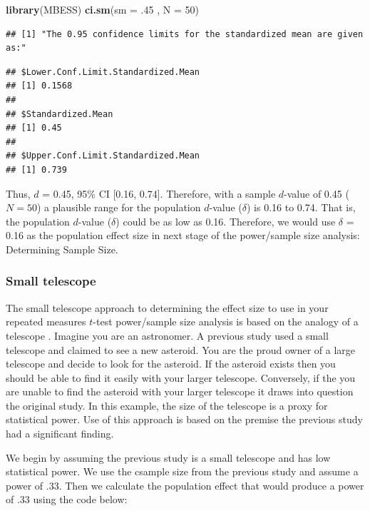 \documentclass[
]{krantz}
\makeatletter
\newenvironment{Shaded}{\begin{snugshade}}{\end{snugshade}}
\newcommand{\DataTypeTok}[1]{\textcolor[rgb]{0.27,0.27,0.27}{#1}}
\newcommand{\DecValTok}[1]{\textcolor[rgb]{0.06,0.06,0.06}{#1}}
\newcommand{\FloatTok}[1]{\textcolor[rgb]{0.06,0.06,0.06}{#1}}
\newcommand{\KeywordTok}[1]{\textcolor[rgb]{0.27,0.27,0.27}{\textbf{#1}}}
\newcommand{\NormalTok}[1]{#1}
\newenvironment{kframe}{%
\medskip{}
\setlength{\fboxsep}{.8em}
 \def\at@end@of@kframe{}%
 \ifinner\ifhmode%
  \def\at@end@of@kframe{\end{minipage}}%
  \begin{minipage}{\columnwidth}%
 \fi\fi%
 \def\FrameCommand##1{\hskip\@totalleftmargin \hskip-\fboxsep
 \colorbox{shadecolor}{##1}\hskip-\fboxsep
     \hskip-\linewidth \hskip-\@totalleftmargin \hskip\columnwidth}%
 \MakeFramed {\advance\hsize-\width
   \@totalleftmargin\z@ \linewidth\hsize
   \@setminipage}}%
 {\par\unskip\endMakeFramed%
 \at@end@of@kframe}
\renewenvironment{Shaded}{\begin{kframe}}{\end{kframe}}
\makeatother
\begin{document}
\begin{Shaded}
\begin{Highlighting}[]
\KeywordTok{library}\NormalTok{(MBESS)}
\KeywordTok{ci.sm}\NormalTok{(}\DataTypeTok{sm =} \FloatTok{.45}\NormalTok{ , }\DataTypeTok{N =} \DecValTok{50}\NormalTok{) }
\end{Highlighting}
\end{Shaded}

\begin{verbatim}
## [1] "The 0.95 confidence limits for the standardized mean are given as:"
\end{verbatim}

\begin{verbatim}
## $Lower.Conf.Limit.Standardized.Mean
## [1] 0.1568
## 
## $Standardized.Mean
## [1] 0.45
## 
## $Upper.Conf.Limit.Standardized.Mean
## [1] 0.739
\end{verbatim}

Thus, \(d\) = 0.45, 95\% CI {[}0.16, 0.74{]}. Therefore, with a sample \(d\)-value of 0.45 (\(N=50\)) a plausible range for the population \(d\)-value (\(\delta\)) is 0.16 to 0.74. That is, the population \(d\)-value (\(\delta\)) could be as low as 0.16. Therefore, we would use \(\delta\) = 0.16 as the population effect size in next stage of the power/sample size analysis: Determining Sample Size.

\hypertarget{small-telescope-1}{%
\subsubsection{Small telescope}\label{small-telescope-1}}

The small telescope approach to determining the effect size to use in your repeated measures \(t\)-test power/sample size analysis is based on the analogy of a telescope \citep{simonsohn2015small}. Imagine you are an astronomer. A previous study used a small telescope and claimed to see a new asteroid. You are the proud owner of a large telescope and decide to look for the asteroid. If the asteroid exists then you should be able to find it easily with your larger telescope. Conversely, if the you are unable to find the asteroid with your larger telescope it draws into question the original study. In this example, the size of the telescope is a proxy for statistical power. Use of this approach is based on the premise the previous study had a significant finding.

We begin by assuming the previous study is a small telescope and has low statistical power. We use the csample size from the previous study and assume a power of .33. Then we calculate the population effect that would produce a power of .33 using the code below:
\end{document}
